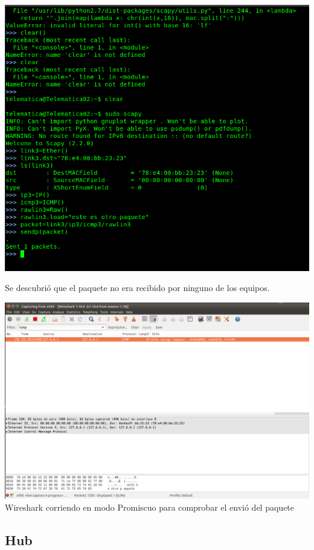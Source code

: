 \documentclass[spanish]{udpreport}
\begin{document}
\begin{center}
	\includegraphics[scale=.37]{imagenes/Switch/Test_3.png}
\end{center}

Se descubrió que el paquete no era recibido por ninguno de los equipos.

\begin{center}
	\includegraphics[scale=.27]{imagenes/Switch/Test_3_Wireshark.png}
	\\ Wireshark corriendo en modo Promiscuo para comprobar el envió del paquete
\end{center}

\newpage


\subsection{Hub}
\end{document}
